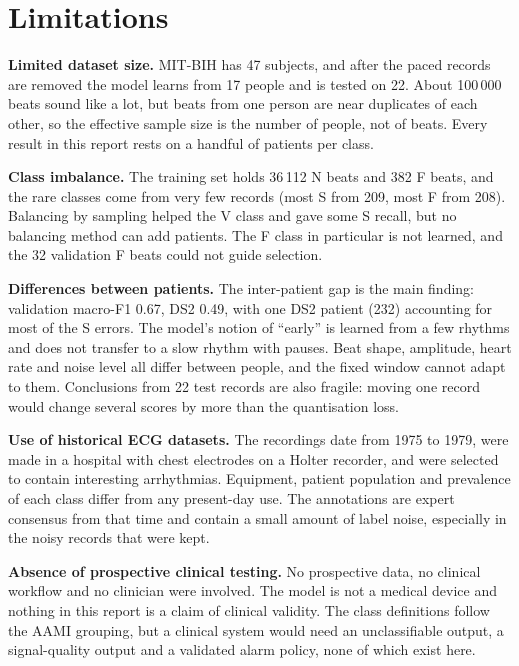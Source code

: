 \section{Limitations}
\label{sec:limitations}

\textbf{Limited dataset size.} MIT-BIH has 47 subjects, and after the paced records are removed the model learns from 17 people and is tested on 22. About 100\,000 beats sound like a lot, but beats from one person are near duplicates of each other, so the effective sample size is the number of people, not of beats. Every result in this report rests on a handful of patients per class.

\textbf{Class imbalance.} The training set holds 36\,112 N beats and 382 F beats, and the rare classes come from very few records (most S from 209, most F from 208). Balancing by sampling helped the V class and gave some S recall, but no balancing method can add patients. The F class in particular is not learned, and the 32 validation F beats could not guide selection.

\textbf{Differences between patients.} The inter-patient gap is the main finding: validation macro-F1 0.67, DS2 0.49, with one DS2 patient (232) accounting for most of the S errors. The model's notion of ``early'' is learned from a few rhythms and does not transfer to a slow rhythm with pauses. Beat shape, amplitude, heart rate and noise level all differ between people, and the fixed window cannot adapt to them. Conclusions from 22 test records are also fragile: moving one record would change several scores by more than the quantisation loss.

\textbf{Use of historical ECG datasets.} The recordings date from 1975 to 1979, were made in a hospital with chest electrodes on a Holter recorder, and were selected to contain interesting arrhythmias. Equipment, patient population and prevalence of each class differ from any present-day use. The annotations are expert consensus from that time and contain a small amount of label noise, especially in the noisy records that were kept.

\textbf{Absence of prospective clinical testing.} No prospective data, no clinical workflow and no clinician were involved. The model is not a medical device and nothing in this report is a claim of clinical validity. The class definitions follow the AAMI grouping, but a clinical system would need an unclassifiable output, a signal-quality output and a validated alarm policy, none of which exist here.

